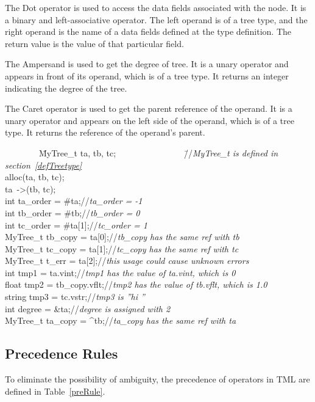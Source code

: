 \documentclass[12pt,psfig,a4]{article}
\begin{document}
The Dot operator is used to access the data fields associated with the node. It is a binary and left-associative operator. The left operand is of a tree type, and the right operand is the name of a data fields defined at the type definition. The return value is the value of that particular field.

The Ampersand is used to get the degree of tree. It is a unary operator and appears in front of its operand, which is of a tree type. It returns an integer indicating the degree of the tree.

The Caret operator is used to get the parent reference of the operand. It is a unary operator and appears on the left side of the operand, which is of a tree type. It returns the reference of the operand's parent.


\begin{code}
\begin{tabbing}
~~~~~~~~\= MyTree\_t ta, tb, tc;~~~~~~~~~~~~~~~~\=//\textit{MyTree\_t is defined in section~\ref{defTreetype}}\\
\> alloc(ta, tb, tc);\\
\> ta~-\textgreater(tb, tc);\\
\> int ta\_order = \#ta;\>//\textit{ta\_order = -1}\\
\> int tb\_order = \#tb;\>//\textit{tb\_order = 0}\\
\> int tc\_order = \#ta[1];\>//\textit{tc\_order = 1}\\
\> MyTree\_t tb\_copy = ta[0];\>//\textit{tb\_copy has the same ref with tb}\\
\> MyTree\_t tc\_copy = ta[1];\>//\textit{tc\_copy has the same ref with tc}\\
\> MyTree\_t t\_err = ta[2];\>//\textit{this usage could cause unknown errors}\\
\> int tmp1 = ta.vint;\>//\textit{tmp1 has the value of ta.vint, which is 0}\\
\> float tmp2 = tb\_copy.vflt;\>//\textit{tmp2 has the value of tb.vflt, which is 1.0}\\
\> string tmp3 = tc.vstr;\>//\textit{tmp3 is ''hi ''}\\
\> int degree = \&ta;\>//\textit{degree is assigned with 2}\\
\> MyTree\_t ta\_copy = \^{}tb;\>//\textit{ta\_copy has the same ref with ta}
\end{tabbing}
\end{code}

\subsection{Precedence Rules}
To eliminate the possibility of ambiguity, the precedence of operators in TML are defined in Table~\ref{preRule}.
\end{document}
